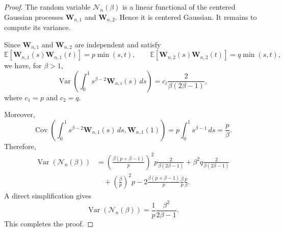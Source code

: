 \documentclass[reqno,openbib,runningheads,a4paper,12pt]{amsart}%
\begin{document}
\begin{proof}
The random variable $\mathcal{N}_{n}(\beta)$ is a linear functional of the
centered Gaussian processes $\mathbf{W}_{n,1}$ and $\mathbf{W}_{n,2}$. Hence
it is centered Gaussian. It remains to compute its variance.\smallskip

\noindent Since $\mathbf{W}_{n,1}$ and $\mathbf{W}_{n,2}$ are independent and
satisfy
\[
\mathbb{E}[\mathbf{W}_{n,1}(s)\mathbf{W}_{n,1}(t)]=p\min(s,t),\qquad
\mathbb{E}[\mathbf{W}_{n,2}(s)\mathbf{W}_{n,2}(t)]=q\min(s,t),
\]
we have, for $\beta>1$,
\[
\operatorname{Var}\left(  \int_{0}^{1}s^{\beta-2}\mathbf{W}_{n,i}%
(s)\,ds\right)  =c_{i}\frac{2}{\beta(2\beta-1)},
\]
where $c_{1}=p$ and $c_{2}=q$.\smallskip

\noindent Moreover,
\[
\operatorname{Cov}\left(  \int_{0}^{1}s^{\beta-2}\mathbf{W}_{n,1}%
(s)\,ds,\mathbf{W}_{n,1}(1)\right)  =p\int_{0}^{1}s^{\beta-1}\,ds=\frac
{p}{\beta}.
\]
Therefore,
\[
\begin{aligned}
		\operatorname{Var}\!\left(\mathcal{N}_{n}(\beta)\right)
		&=
		\left(\frac{\beta(p+\beta-1)}{p}\right)^{2}
		p\frac{2}{\beta(2\beta-1)}
		+
		\beta^{2}q\frac{2}{\beta(2\beta-1)}
		\\
		&\quad
		+
		\left(\frac{\beta}{p}\right)^{2}p
		-
		2\frac{\beta(p+\beta-1)}{p}\frac{\beta}{p}\frac{p}{\beta}.
	\end{aligned}
\]
A direct simplification gives
\[
\operatorname{Var}\!\left(  \mathcal{N}_{n}(\beta)\right)  =\frac{1}{p}%
\frac{\beta^{2}}{2\beta-1}.
\]
This completes the proof.
\end{proof}
\end{document}
